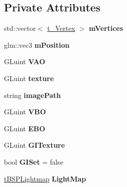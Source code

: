 \subsection*{Private Attributes}
\begin{DoxyCompactItemize}
\item 
std\+::vector$<$ \hyperlink{struct_b_s_p_face_1_1t___vertex}{t\+\_\+\+Vertex} $>$ {\bfseries m\+Vertices}\hypertarget{class_b_s_p_face_ad5ebb6100ab23467e7737c25fd8e8523}{}\label{class_b_s_p_face_ad5ebb6100ab23467e7737c25fd8e8523}

\item 
glm\+::vec3 {\bfseries m\+Position}\hypertarget{class_b_s_p_face_a99cf0e5077e2ec7386b2d7ca18dbaf69}{}\label{class_b_s_p_face_a99cf0e5077e2ec7386b2d7ca18dbaf69}

\item 
G\+Luint {\bfseries V\+AO}\hypertarget{class_b_s_p_face_a37f5fb2c6dc1fca509a3270de9d63d5f}{}\label{class_b_s_p_face_a37f5fb2c6dc1fca509a3270de9d63d5f}

\item 
G\+Luint {\bfseries texture}\hypertarget{class_b_s_p_face_a70b3c4166cf280c5c2ff0268b7acafbf}{}\label{class_b_s_p_face_a70b3c4166cf280c5c2ff0268b7acafbf}

\item 
string {\bfseries image\+Path}\hypertarget{class_b_s_p_face_a0ba38134841b9f59d1f430aef37a87ca}{}\label{class_b_s_p_face_a0ba38134841b9f59d1f430aef37a87ca}

\item 
G\+Luint {\bfseries V\+BO}\hypertarget{class_b_s_p_face_af68418b4c1d2714a2d1c2d07e90484d7}{}\label{class_b_s_p_face_af68418b4c1d2714a2d1c2d07e90484d7}

\item 
G\+Luint {\bfseries E\+BO}\hypertarget{class_b_s_p_face_aff1f36c5b368c9dad1b005083d087991}{}\label{class_b_s_p_face_aff1f36c5b368c9dad1b005083d087991}

\item 
G\+Luint {\bfseries G\+I\+Texture}\hypertarget{class_b_s_p_face_a9d8138d21cf83781f8feaacfc6744058}{}\label{class_b_s_p_face_a9d8138d21cf83781f8feaacfc6744058}

\item 
bool {\bfseries G\+I\+Set} = false\hypertarget{class_b_s_p_face_a7d14051390a327bc3476c2a68177cd5a}{}\label{class_b_s_p_face_a7d14051390a327bc3476c2a68177cd5a}

\item 
\hyperlink{structt_b_s_p_lightmap}{t\+B\+S\+P\+Lightmap} {\bfseries Light\+Map}\hypertarget{class_b_s_p_face_aea4a6c2edb342e354ef6290d2b27f5d7}{}\label{class_b_s_p_face_aea4a6c2edb342e354ef6290d2b27f5d7}


\end{DoxyCompactItemize}
